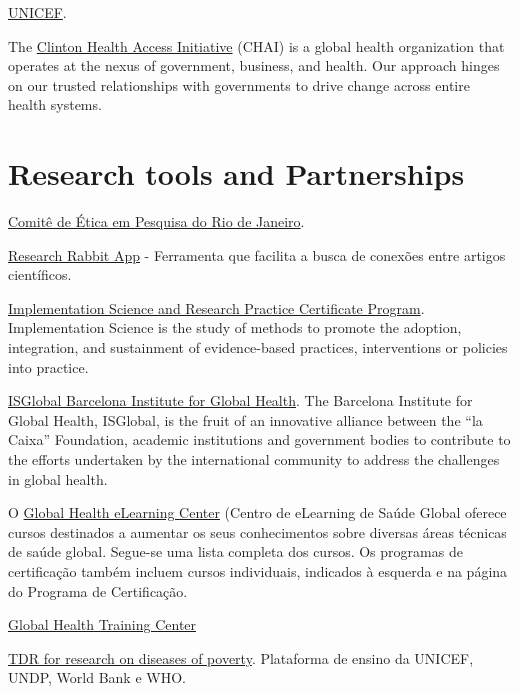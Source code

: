 \documentclass[
  letterpaper,
  DIV=11,
  numbers=noendperiod]{scrreprt}
\begin{document}
\href{https://jobs.unicef.org/en-us/listing/?jobnotfound=true}{UNICEF}.

The
\href{https://www.clintonhealthaccess.org/about-us/\#history}{Clinton
Health Access Initiative} (CHAI) is a global health organization that
operates at the nexus of government, business, and health. Our approach
hinges on our trusted relationships with governments to drive change
across entire health systems.


\chapter{Research tools and
Partnerships}\label{research-tools-and-partnerships}

\href{https://saude.prefeitura.rio/comite-de-etica-em-pesquisa/}{Comitê
de Ética em Pesquisa do Rio de Janeiro}.

\href{https://researchrabbitapp.com/}{Research Rabbit App} - Ferramenta
que facilita a busca de conexões entre artigos científicos.

\href{https://publichealth.jhu.edu/academics/implementation-science-and-research-practice-certificate-program}{Implementation
Science and Research Practice Certificate Program}. Implementation
Science is the study of methods to promote the adoption, integration,
and sustainment of evidence-based practices, interventions or policies
into practice.

\href{https://www.isglobal.org/en/about-us}{ISGlobal Barcelona Institute
for Global Health}. The Barcelona Institute for Global Health, ISGlobal,
is the fruit of an innovative alliance between the ``la Caixa''
Foundation, academic institutions and government bodies to contribute to
the efforts undertaken by the international community to address the
challenges in global health.

O \href{https://www.globalhealthlearning.org/pt/courses}{Global Health
eLearning Center} (Centro de eLearning de Saúde Global oferece cursos
destinados a aumentar os seus conhecimentos sobre diversas áreas
técnicas de saúde global. Segue-se uma lista completa dos cursos. Os
programas de certificação também incluem cursos individuais, indicados à
esquerda e na página do Programa de Certificação.

\href{https://globalhealthtrainingcentre.tghn.org/elearning/}{Global
Health Training Center}

\href{https://tdrmooc.org/login?next=/dashboard}{TDR for research on
diseases of poverty}. Plataforma de ensino da UNICEF, UNDP, World Bank e
WHO.
\end{document}
